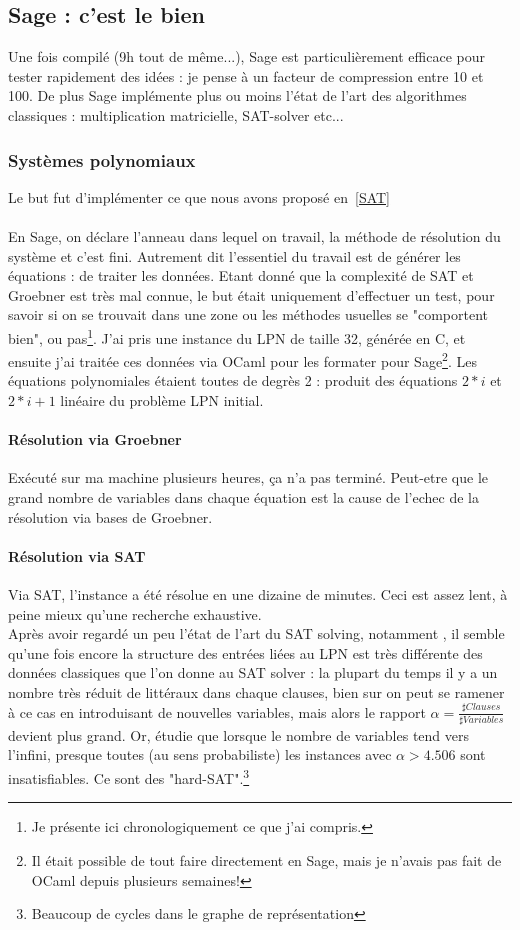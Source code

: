 \documentclass{article}		%
\begin{document}
\subsection{Sage : c'est le bien}
Une fois compilé (9h tout de même...), Sage est particulièrement efficace
pour tester rapidement des idées : je pense à un facteur de compression
entre 10 et 100. De plus Sage
implémente plus ou moins l'état de l'art des algorithmes classiques : multiplication
matricielle, SAT-solver etc...  


\subsubsection{Systèmes polynomiaux}
Le but fut d'implémenter ce que nous avons proposé en~\ref{SAT}
\\\\
En Sage, on déclare l'anneau dans lequel on travail, la méthode de
résolution du système et c'est fini. Autrement dit l'essentiel du travail
est de générer les équations : de traiter les données. Etant donné que la
complexité de SAT et Groebner est très mal connue, le but était
uniquement d'effectuer un test, pour savoir si on se trouvait dans une
zone ou les méthodes usuelles se "comportent bien", ou pas\footnote{Je
présente ici chronologiquement ce que j'ai compris.}.
J'ai pris une instance du LPN de taille 32, générée en C, et ensuite j'ai
traitée ces données via OCaml pour les formater pour Sage\footnote{Il
était possible de tout faire directement en Sage, mais je n'avais pas
fait de OCaml depuis plusieurs semaines!}. Les équations polynomiales
étaient toutes de degrès 2 : produit des équations $2*i$ et $2*i+1$
linéaire du problème LPN initial.
\paragraph{Résolution via Groebner}
Exécuté sur ma machine plusieurs heures, ça n'a pas terminé. Peut-etre 
que le grand nombre de variables dans chaque équation est la cause de
l'echec de la résolution via
bases de Groebner.
\paragraph{Résolution via SAT}
Via SAT, l'instance a été résolue en une dizaine de minutes. Ceci est
assez lent, à peine mieux qu'une recherche exhaustive. 
\\
Après avoir regardé
un peu l'état de l'art du SAT solving, notamment \cite{Mezard}, il semble qu'une fois encore la
structure des entrées liées au LPN est très différente des données
classiques que l'on donne au SAT solver : la plupart du temps il y a un
nombre très réduit de littéraux dans chaque clauses, bien sur on peut se
ramener à ce cas en introduisant de nouvelles variables, mais alors le
rapport $\alpha=\frac {\sharp Clauses}{\sharp Variables}$ devient plus grand.
Or, \cite{Dubois} étudie que lorsque le nombre de variables tend vers
l'infini, presque toutes (au sens probabiliste) les
instances avec $\alpha > 4.506$ sont insatisfiables. Ce sont des
"hard-SAT".\footnote{Beaucoup de cycles dans le graphe de représentation}
\end{document}
